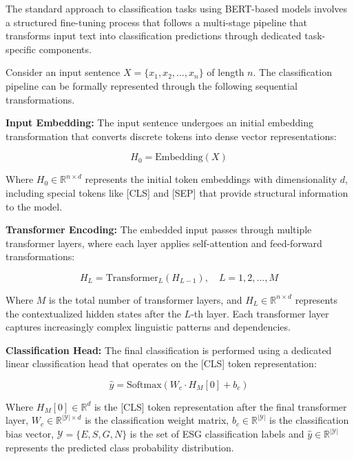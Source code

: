 \documentclass[12pt, letterpaper]{template}
\begin{document}

The standard approach to classification tasks using BERT-based models involves a structured fine-tuning process that follows a multi-stage pipeline that transforms input text into classification predictions through dedicated task-specific components.

Consider an input sentence $X = \{x_1, x_2, \ldots, x_n\}$ of length $n$. The classification pipeline can be formally represented through the following sequential transformations.

{\bf Input Embedding:}
The input sentence undergoes an initial embedding transformation that converts discrete tokens into dense vector representations:

\begin{equation}
  H_0 = \text{Embedding}(X)  
\end{equation}

Where $H_0 \in \mathbb{R}^{n \times d}$ represents the initial token embeddings with dimensionality $d$, including special tokens like [CLS] and [SEP] that provide structural information to the model.

{\bf Transformer Encoding:}
The embedded input passes through multiple transformer layers, where each layer applies self-attention and feed-forward transformations:

\begin{equation}
H_L = \text{Transformer}_L(H_{L-1}), \quad L = 1, 2, \ldots, M
\end{equation}

Where $M$ is the total number of transformer layers, and $H_L \in \mathbb{R}^{n \times d}$ represents the contextualized hidden states after the $L$-th layer. Each transformer layer captures increasingly complex linguistic patterns and dependencies.

{\bf Classification Head:}
The final classification is performed using a dedicated linear classification head that operates on the [CLS] token representation:

\begin{equation}
\hat{y} = \text{Softmax}(W_c \cdot H_M[0] + b_c)
\end{equation}

Where $H_M[0] \in \mathbb{R}^{d}$ is the [CLS] token representation after the final transformer layer, $W_c \in \mathbb{R}^{|\mathcal{Y}| \times d}$ is the classification weight matrix, $b_c \in \mathbb{R}^{|\mathcal{Y}|}$ is the classification bias vector, $\mathcal{Y} = \{E, S, G, N\}$ is the set of ESG classification labels and $\hat{y} \in \mathbb{R}^{|\mathcal{Y}|}$ represents the predicted class probability distribution.
\end{document}
